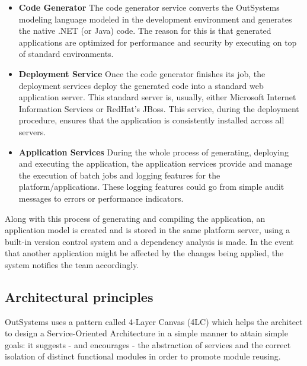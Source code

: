 \documentclass{sigchi}
\begin{document}
\begin{itemize}
    \item \textbf{Code Generator} The code generator service converts the OutSystems modeling language modeled in the development environment and generates the native .NET (or Java) code. The reason for this is that generated applications are optimized for performance and security by executing on top of standard environments.
    \item \textbf{Deployment Service} Once the code generator finishes its job, the deployment services deploy the generated code into a standard web application server. This standard server is, usually, either Microsoft Internet Information Services or RedHat's JBoss. This service, during the deployment procedure, ensures that the application is consistently installed across all servers.
    \item \textbf{Application Services} During the whole process of generating, deploying and executing the application, the application services provide and manage the execution of batch jobs and logging features for the platform/applications. These logging features could go from simple audit messages to errors or performance indicators.
\end{itemize}
Along with this process of generating and compiling the application, an application model is created and is stored in the same platform server, using a built-in version control system and a dependency analysis is made. In the event that another application might be affected by the changes being applied, the system notifies the team accordingly.

\subsection{Architectural principles}
OutSystems uses a pattern called 4-Layer Canvas (4LC) which helps the architect to design a Service-Oriented Architecture in a simple manner to attain simple goals: it suggests - and encourages - the abstraction of services and the correct isolation of distinct functional modules in order to promote module reusing.
\end{document}
